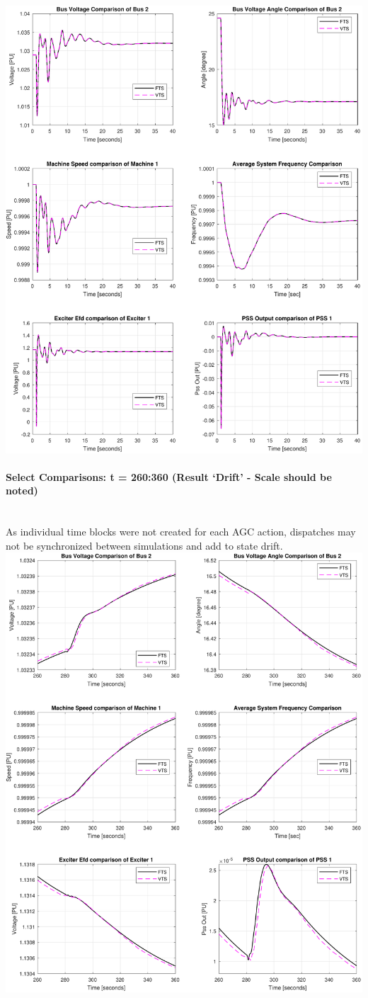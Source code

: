 \documentclass[12pt]{article}
\begin{document}
\includegraphics[width=\linewidth]{MWdetailComp1}


\pagebreak
\paragraph{Select Comparisons: t = 260:360 (Result `Drift' - Scale should be noted)} \ \\
As individual time blocks were not created for each AGC action, dispatches may not be synchronized between simulations and add to state drift. \\

\includegraphics[width=\linewidth]{MWdetailComp2}
\end{document}
